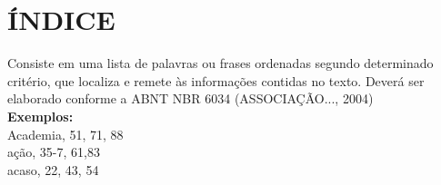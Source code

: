 \chapter*{\textbf{ÍNDICE}} %

Consiste em uma lista de palavras ou frases ordenadas segundo determinado critério, que localiza e remete às informações contidas no texto. Deverá ser elaborado conforme a ABNT NBR 6034 (ASSOCIAÇÃO..., 2004)\\

\textbf{Exemplos:}\\

\noindent
Academia, 51, 71, 88\\
ação, 35-7, 61,83\\
acaso, 22, 43, 54\\

